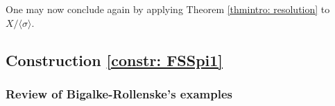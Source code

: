 \documentclass[12pt,reqno]{amsart}
\theoremstyle{definition}
\newtheorem{rem}[thm]{Remark}
\newcommand{\Z}{\mathbb{Z}}
\begin{document}
One may now conclude again by applying Theorem \ref{thmintro: resolution} to $X/\langle \sigma\rangle$.

\subsection{Construction \ref{constr: FSSpi1}}\label{sec: FSS}
\subsubsection{Review of Bigalke-Rollenske's examples}
\end{document}
